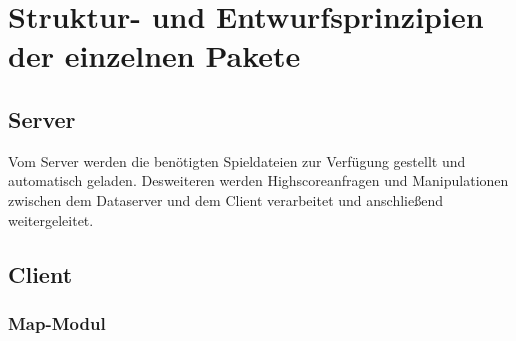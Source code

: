 \documentclass[11pt,a4paper]{article}
\begin{document}
\section{Struktur- und Entwurfsprinzipien der einzelnen Pakete}
\subsection{Server} Vom Server werden die benötigten Spieldateien zur Verfügung gestellt und automatisch geladen. Desweiteren werden Highscoreanfragen und Manipulationen zwischen dem Dataserver und dem Client verarbeitet und anschließend weitergeleitet.

\subsection{Client}
\subsubsection{Map-Modul}
\end{document}
